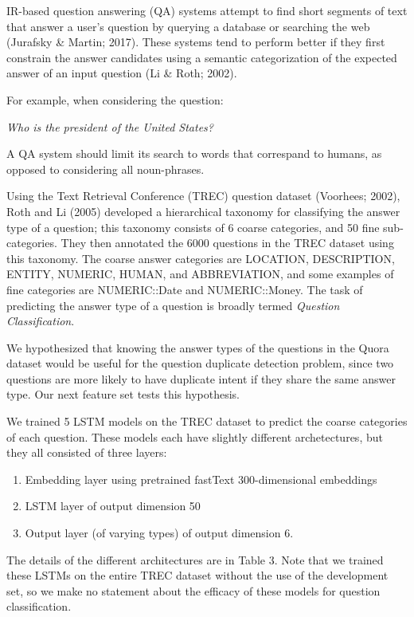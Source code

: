 \documentclass[letterpaper, 10 pt, conference]{ieeeconf}  %
\begin{document}
IR-based question answering (QA) systems attempt to find short segments of text that answer a user’s question by querying a database or searching the web (Jurafsky \& Martin; 2017). These systems tend to perform better if they first constrain the answer candidates using a semantic categorization of the expected answer of an input question (Li \& Roth; 2002).  

For example, when considering the question:
\begin{center}
\emph{Who is the president of the United States?}
\end{center}
A QA system should limit its search to words that correspand to humans, as opposed to considering all noun-phrases.

Using the Text Retrieval Conference (TREC) question dataset (Voorhees; 2002), Roth and Li (2005) developed a hierarchical taxonomy for classifying the answer type of a question; this taxonomy consists of 6 coarse categories, and 50 fine sub-categories. They then annotated the 6000 questions in the TREC dataset using this taxonomy. The coarse answer categories are LOCATION, DESCRIPTION, ENTITY, NUMERIC, HUMAN, and ABBREVIATION, and some examples of fine categories are NUMERIC::Date and NUMERIC::Money. The task of predicting the answer type of a question is broadly termed \emph{Question Classification}. 

We hypothesized that knowing the answer types of the questions in the Quora dataset would be useful for the question duplicate detection problem, since two questions are more likely to have duplicate intent if they share the same answer type. Our next feature set tests this hypothesis. 

We trained 5 LSTM models on the TREC dataset to predict the coarse categories of each question. These models each have slightly different archetectures, but they all consisted of three layers:
\begin{enumerate}
\item Embedding layer using pretrained fastText 300-dimensional embeddings
\item LSTM layer of output dimension 50
\item Output layer (of varying types) of output dimension 6.
\end{enumerate}
The details of the different architectures are in Table 3. Note that we trained these LSTMs on the entire TREC dataset without the use of the development set,  so we make no statement about the efficacy of these models for question classification.
\end{document}
